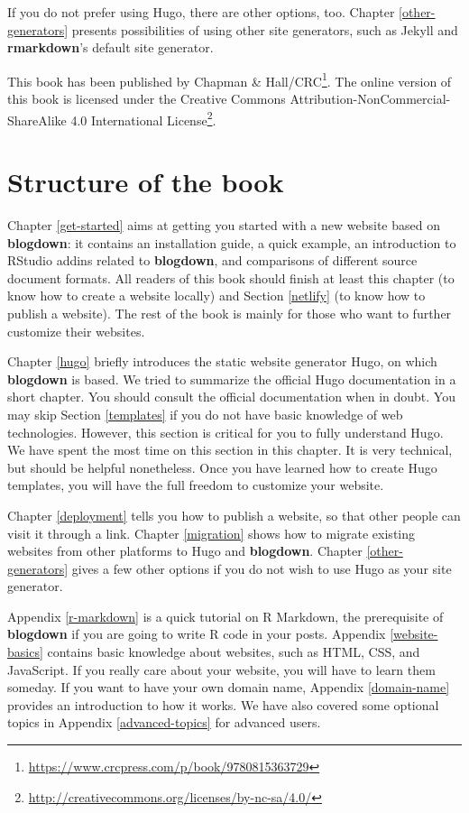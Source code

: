 \documentclass[
  12pt,
]{krantz}
\renewcommand{\href}[2]{#2\footnote{\url{#1}}}
\begin{document}
If you do not prefer using Hugo, there are other options, too. Chapter \ref{other-generators} presents possibilities of using other site generators, such as Jekyll and \textbf{rmarkdown}'s default site generator.

This book has been published by \href{https://www.crcpress.com/p/book/9780815363729}{Chapman \& Hall/CRC}. The online version of this book is licensed under the \href{http://creativecommons.org/licenses/by-nc-sa/4.0/}{Creative Commons Attribution-NonCommercial-ShareAlike 4.0 International License}.

\hypertarget{structure-of-the-book}{%
\section*{Structure of the book}\label{structure-of-the-book}}


Chapter \ref{get-started} aims at getting you started with a new website based on \textbf{blogdown}: it contains an installation guide, a quick example, an introduction to RStudio addins related to \textbf{blogdown}, and comparisons of different source document formats. All readers of this book should finish at least this chapter (to know how to create a website locally) and Section \ref{netlify} (to know how to publish a website). The rest of the book is mainly for those who want to further customize their websites.

Chapter \ref{hugo} briefly introduces the static website generator Hugo, on which \textbf{blogdown} is based. We tried to summarize the official Hugo documentation in a short chapter. You should consult the official documentation when in doubt. You may skip Section \ref{templates} if you do not have basic knowledge of web technologies. However, this section is critical for you to fully understand Hugo. We have spent the most time on this section in this chapter. It is very technical, but should be helpful nonetheless. Once you have learned how to create Hugo templates, you will have the full freedom to customize your website.

Chapter \ref{deployment} tells you how to publish a website, so that other people can visit it through a link. Chapter \ref{migration} shows how to migrate existing websites from other platforms to Hugo and \textbf{blogdown}. Chapter \ref{other-generators} gives a few other options if you do not wish to use Hugo as your site generator.

Appendix \ref{r-markdown} is a quick tutorial on R Markdown, the prerequisite of \textbf{blogdown} if you are going to write R code in your posts. Appendix \ref{website-basics} contains basic knowledge about websites, such as HTML, CSS, and JavaScript. If you really care about your website, you will have to learn them someday. If you want to have your own domain name, Appendix \ref{domain-name} provides an introduction to how it works. We have also covered some optional topics in Appendix \ref{advanced-topics} for advanced users.
\end{document}

